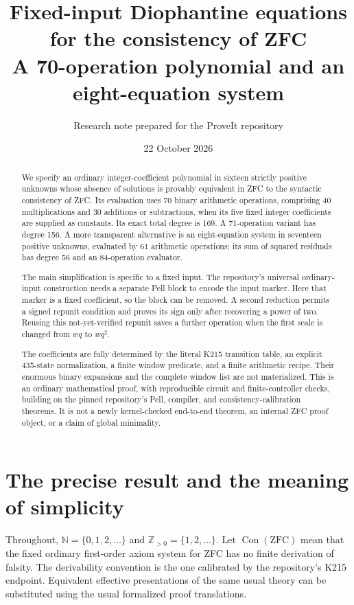 \documentclass[11pt]{article}
\title{Fixed-input Diophantine equations for the consistency of ZFC\\[5pt]
\large A 70-operation polynomial and an eight-equation system}
\author{Research note prepared for the ProveIt repository}
\date{22 October 2026}
\theoremstyle{definition}
\newcommand{\N}{\mathbb N}
\newcommand{\Pos}{\mathbb Z_{>0}}
\newcommand{\Con}{\operatorname{Con}}
\begin{document}
\maketitle
\begin{abstract}
We specify an ordinary integer-coefficient polynomial in sixteen strictly
positive unknowns whose absence of solutions is provably equivalent in ZFC
to the syntactic consistency of ZFC. Its evaluation uses 70 binary arithmetic
operations, comprising 40 multiplications and 30 additions or subtractions,
when its five fixed integer coefficients are supplied as constants. Its exact
total degree is 169. A 71-operation variant has degree 156. A more transparent
alternative is an eight-equation system in seventeen positive unknowns,
evaluated by 61 arithmetic operations; its sum of squared residuals has degree
56 and an 84-operation evaluator.

The main simplification is specific to a fixed input. The repository's
universal ordinary-input construction needs a separate Pell block to encode
the input marker. Here that marker is a fixed coefficient, so the block can
be removed. A second reduction permits a signed repunit condition and proves
its sign only after recovering a power of two. Reusing this not-yet-verified
repunit saves a further operation when the first scale is changed from
$wq$ to $wq^2$.

The coefficients are fully determined by the literal K215 transition table,
an explicit 435-state normalization, a finite window predicate, and a finite
arithmetic recipe. Their enormous binary expansions and the complete window
list are not materialized. This is an ordinary mathematical proof, with
reproducible circuit and finite-controller checks, building on the pinned
repository's Pell, compiler, and consistency-calibration theorems. It is not
a newly kernel-checked end-to-end theorem, an internal ZFC proof object,
or a claim of global minimality.
\end{abstract}

\clearpage
\tableofcontents
\newpage

\section{The precise result and the meaning of simplicity}

Throughout, $\N=\{0,1,2,\ldots\}$ and $\Pos=\{1,2,\ldots\}$.
Let $\Con(\mathrm{ZFC})$ mean that the fixed ordinary first-order axiom system
for ZFC has no finite derivation of falsity. The derivability convention is
the one calibrated by the repository's K215 endpoint. Equivalent effective
presentations of the same usual theory can be substituted using the usual
formalized proof translations.
\end{document}

